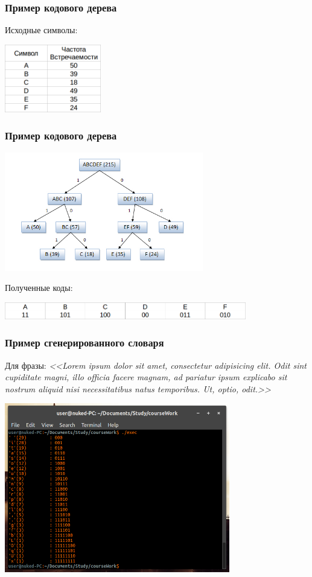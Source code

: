 \documentclass[10pt,pdf,hyperref={unicode}]{beamer}
\begin{document}
\begin{frame}
	\frametitle{Пример кодового дерева}
	Исходные символы:
	\newline\newline
	\centerline{\includegraphics[height=8em]{tree_sym.png}}
\end{frame}

\begin{frame}
	\frametitle{Пример кодового дерева}
	\centerline{\includegraphics[height=14em]{tree.png}}
	Полученные коды:
	\newline\newline
	\centerline{\includegraphics[height=2em]{tree_code.png}}
\end{frame}

\begin{frame}
	\frametitle{Пример сгенерированного словаря}
	Для фразы:
	\newline\newline
	\scriptsize{\textit{<<Lorem ipsum dolor sit amet, consectetur adipisicing elit. Odit sint cupiditate magni, illo officia facere magnam, ad pariatur ipsum explicabo sit nostrum aliquid nisi necessitatibus natus temporibus. Ut, optio, odit.>>}}
	\newline\newline
	\centerline{\includegraphics[height=20em]{gen.png}}
\end{frame}
\end{document}
